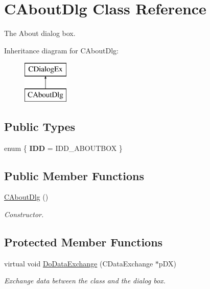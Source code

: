 \hypertarget{class_c_about_dlg}{\section{C\+About\+Dlg Class Reference}
\label{class_c_about_dlg}
}


The About dialog box.  


Inheritance diagram for C\+About\+Dlg\+:\begin{figure}[H]
\begin{center}
\leavevmode
\includegraphics[height=2.000000cm]{class_c_about_dlg}
\end{center}
\end{figure}
\subsection*{Public Types}
\begin{DoxyCompactItemize}
\item 
\hypertarget{class_c_about_dlg_a27a5d4c47f16acb8562522fcd22871f7}{enum \{ {\bfseries I\+D\+D} = I\+D\+D\+\_\+\+A\+B\+O\+U\+T\+B\+O\+X
 \}}\label{class_c_about_dlg_a27a5d4c47f16acb8562522fcd22871f7}

\end{DoxyCompactItemize}
\subsection*{Public Member Functions}
\begin{DoxyCompactItemize}
\item 
\hypertarget{class_c_about_dlg_a6d1e6a33fef23bee6e75254189d865ce}{\hyperlink{class_c_about_dlg_a6d1e6a33fef23bee6e75254189d865ce}{C\+About\+Dlg} ()}\label{class_c_about_dlg_a6d1e6a33fef23bee6e75254189d865ce}

\begin{DoxyCompactList}\small\item\em Constructor. \end{DoxyCompactList}\end{DoxyCompactItemize}
\subsection*{Protected Member Functions}
\begin{DoxyCompactItemize}
\item 
virtual void \hyperlink{class_c_about_dlg_ab83db7484fec957282d7d5a21aed4df4}{Do\+Data\+Exchange} (C\+Data\+Exchange $\ast$p\+D\+X)
\begin{DoxyCompactList}\small\item\em Exchange data between the class and the dialog box. \end{DoxyCompactList}\end{DoxyCompactItemize}


